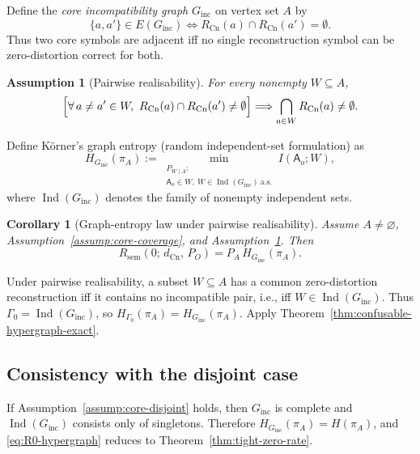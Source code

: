 \documentclass[journal,onecolumn]{IEEEtran}
\makeatletter
\newcommand{\Cn}{\text{Cn}}
\newtheorem{assumption}{Assumption}[section]
\newtheorem{corollary}{Corollary}[section]
\numberwithin{equation}{section}
\renewenvironment{proof}[1][\proofname]{\par
  \pushQED{\qed}%
  \normalfont \topsep6\p@\@plus6\p@\relax
  \trivlist
  \item[\hskip\labelsep
        \itshape
    #1\@addpunct{.}]\ignorespaces
}{%
  \popQED\endtrivlist\@endpefalse
}
\DeclareMathOperator{\Ind}{Ind}
\makeatother
\begin{document}
Define the \emph{core incompatibility graph} \(G_{\mathrm{inc}}\) on vertex set
\(A\) by
\[
  \{a,a'\}\in E(G_{\mathrm{inc}})
  \iff
  R_{\Cn}(a)\cap R_{\Cn}(a')=\emptyset.
\]
Thus two core symbols are adjacent iff no single reconstruction symbol can be
zero-distortion correct for both.

\begin{assumption}[Pairwise realisability]
\label{assump:pairwise-realisability}
For every nonempty \(W\subseteq A\),
\[
  \Bigl[
    \forall\,a\neq a'\in W,\ 
    R_{\Cn}(a)\cap R_{\Cn}(a')\neq\emptyset
  \Bigr]
  \Longrightarrow
  \bigcap_{a\in W}R_{\Cn}(a)\neq\emptyset.
\]
\end{assumption}

Define K\"orner's graph entropy (random independent-set formulation) as
\begin{equation}\label{eq:graph-entropy}
  H_{G_{\mathrm{inc}}}(\pi_A)
  :=
  \min_{\substack{P_{W\mid A}:\\
  \mathsf{A}_o\in W,\ W\in\Ind(G_{\mathrm{inc}})\ \text{a.s.}}}
  I(\mathsf{A}_o;W),
\end{equation}
where \(\Ind(G_{\mathrm{inc}})\) denotes the family of nonempty independent sets.

\begin{corollary}[Graph-entropy law under pairwise realisability]
\label{cor:confusable-graph-entropy}
Assume \(A\neq\varnothing\), Assumption~\ref{assump:core-coverage}, and
Assumption~\ref{assump:pairwise-realisability}. Then
\[
  R_{\mathrm{sem}}(0;\,d_{\Cn},\,P_O)
  =
  P_A\,H_{G_{\mathrm{inc}}}(\pi_A).
\]
\end{corollary}

\begin{proof}[Proof sketch]
Under pairwise realisability, a subset \(W\subseteq A\) has a common
zero-distortion reconstruction iff it contains no incompatible pair, i.e.,
iff \(W\in\Ind(G_{\mathrm{inc}})\). Thus \(\Gamma_0=\Ind(G_{\mathrm{inc}})\), so
\(H_{\Gamma_0}(\pi_A)=H_{G_{\mathrm{inc}}}(\pi_A)\). Apply
Theorem~\ref{thm:confusable-hypergraph-exact}.
\end{proof}

\subsection{Consistency with the disjoint case}
If Assumption~\ref{assump:core-disjoint} holds, then \(G_{\mathrm{inc}}\) is
complete and \(\Ind(G_{\mathrm{inc}})\) consists only of singletons. Therefore
\(H_{G_{\mathrm{inc}}}(\pi_A)=H(\pi_A)\), and
\eqref{eq:R0-hypergraph} reduces to Theorem~\ref{thm:tight-zero-rate}.
\end{document}

